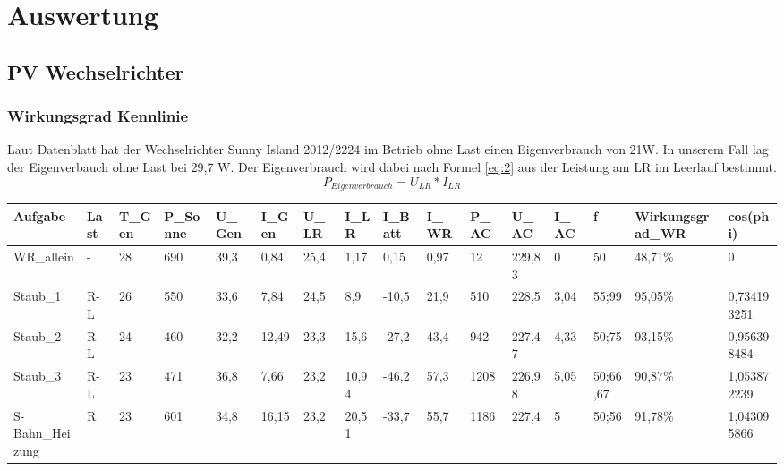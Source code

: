 \section{Auswertung}
\subsection{PV Wechselrichter}
\subsubsection{Wirkungsgrad Kennlinie}
	Laut Datenblatt hat der Wechselrichter Sunny Island 2012/2224 im Betrieb ohne Last einen Eigenverbrauch von 21W. In unserem Fall lag der Eigenverbauch ohne Last bei 29,7 W. Der Eigenverbrauch wird dabei nach Formel \ref{eq:2} aus der Leistung am LR im Leerlauf bestimmt.
%
\begin{equation}
	P_{ Eigenverbrauch }= U_{ LR} * I_{ LR }
\label{eq:2}
\end{equation}
%
\begin{table}[!ht]
    \centering
    \begin{tabular}{|l|l|l|l|l|l|l|l|l|l|l|l|l|l|l|l|}
    \hline
        Aufgabe & Last & T\_Gen & P\_Sonne & U\_Gen & I\_Gen & U\_LR & I\_LR & I\_Batt & I\_WR & P\_AC & U\_AC & I\_AC & f & Wirkungsgrad\_WR & cos(phi) \\ \hline
        WR\_allein & - & 28 & 690 & 39,3 & 0,84 & 25,4 & 1,17 & 0,15 & 0,97 & 12 & 229,83 & 0 & 50 & 48,71\% & 0 \\ \hline
        Staub\_1 & R-L & 26 & 550 & 33,6 & 7,84 & 24,5 & 8,9 & -10,5 & 21,9 & 510 & 228,5 & 3,04 & 55;99 & 95,05\% & 0,734193251 \\ \hline
        Staub\_2 & R-L & 24 & 460 & 32,2 & 12,49 & 23,3 & 15,6 & -27,2 & 43,4 & 942 & 227,47 & 4,33 & 50;75 & 93,15\% & 0,956398484 \\ \hline
        Staub\_3 & R-L & 23 & 471 & 36,8 & 7,66 & 23,2 & 10,94 & -46,2 & 57,3 & 1208 & 226,98 & 5,05 & 50;66,67 & 90,87\% & 1,053872239 \\ \hline
        S-Bahn\_Heizung & R & 23 & 601 & 34,8 & 16,15 & 23,2 & 20,51 & -33,7 & 55,7 & 1186 & 227,4 & 5 & 50;56 & 91,78\% & 1,043095866 \\ \hline

    \end{tabular}
\end{table}

